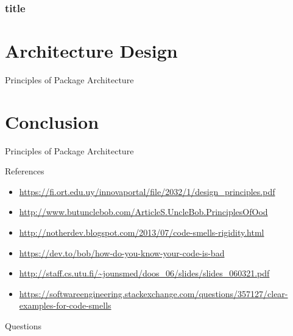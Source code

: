 \documentclass[xcolor=svgnames, handout]{beamer}
\begin{document}

\begin{frame}[t]\frametitle{title}



\end{frame}

\section{Architecture Design}


\begin{frame}{Principles of Package Architecture}
\end{frame}

\section{Conclusion}

\begin{frame}{Principles of Package Architecture}
\end{frame}


\begin{frame}{References}
    \begin{itemize}
        \item \url{https://fi.ort.edu.uy/innovaportal/file/2032/1/design_principles.pdf}
        \item \url{http://www.butunclebob.com/ArticleS.UncleBob.PrinciplesOfOod}
        \item \url{http://notherdev.blogspot.com/2013/07/code-smells-rigidity.html}
        \item \url{https://dev.to/bob/how-do-you-know-your-code-is-bad}
        \item \url{http://staff.cs.utu.fi/~jounsmed/doos_06/slides/slides_060321.pdf}
        \item \url{https://softwareengineering.stackexchange.com/questions/357127/clear-examples-for-code-smells}
    \end{itemize}
\end{frame}


\begin{frame}{Questions}

\end{frame}
\end{document}

